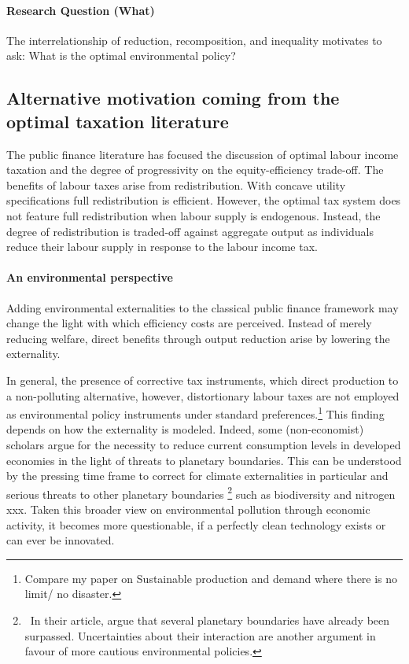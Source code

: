 \documentclass[12pt]{article}
\begin{document}
\paragraph{ Research Question (What)}

The interrelationship of reduction, recomposition, and inequality motivates to ask: What is the optimal environmental policy? 


\subsection{Alternative motivation coming from the optimal taxation literature}
The public finance literature has focused the discussion of optimal labour income taxation and the degree of progressivity on the equity-efficiency trade-off.  The benefits of labour taxes arise from redistribution. With concave utility specifications full redistribution is efficient. However, the optimal tax system does not feature full redistribution when labour supply is endogenous. Instead, the degree of redistribution is traded-off against aggregate output as individuals reduce their labour supply in response to the labour income tax. 

\paragraph{An environmental perspective}
 Adding environmental externalities to the classical public finance framework may change the light with which efficiency costs are perceived. Instead of merely reducing welfare, direct benefits through output reduction arise by lowering the externality. 

In general, the presence of corrective tax instruments, which direct production to a non-polluting alternative, however, distortionary labour taxes are not employed as environmental policy instruments under standard preferences.\footnote{ Compare my paper on Sustainable production and demand where there is no limit/ no disaster.} This finding depends on how the externality is modeled. Indeed, some (non-economist) scholars argue for the necessity to reduce current consumption levels in developed economies in the light of threats to planetary boundaries. This can be understood by the pressing time frame to correct for climate externalities in particular and serious threats to other planetary boundaries \citep{Rockstrom2009AHumanity}\footnote{\ In their article, \cite{Rockstrom2009AHumanity} argue that several planetary boundaries have already been surpassed. Uncertainties about their interaction are another argument in favour of more cautious environmental policies. } such as biodiversity and nitrogen xxx.
Taken this broader view on environmental pollution through economic activity, it becomes more questionable, if a perfectly clean technology exists or can ever be innovated.  
\end{document}
